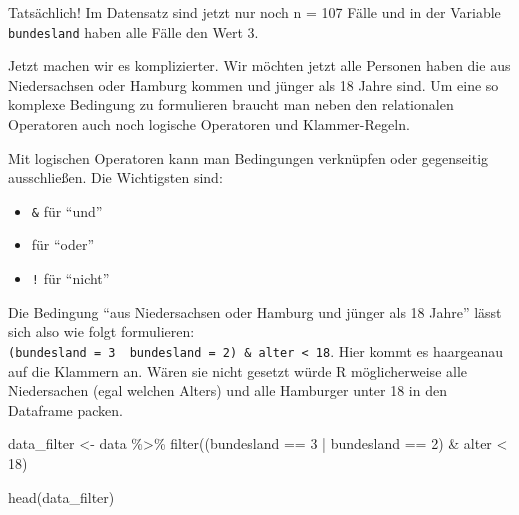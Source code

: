 \documentclass[
]{book}
\newenvironment{Shaded}{\begin{snugshade}}{\end{snugshade}}
\newcommand{\DecValTok}[1]{\textcolor[rgb]{0.00,0.00,0.81}{#1}}
\newcommand{\FunctionTok}[1]{\textcolor[rgb]{0.00,0.00,0.00}{#1}}
\newcommand{\NormalTok}[1]{#1}
\newcommand{\OtherTok}[1]{\textcolor[rgb]{0.56,0.35,0.01}{#1}}
\newcommand{\SpecialCharTok}[1]{\textcolor[rgb]{0.00,0.00,0.00}{#1}}
\begin{document}
Tatsächlich! Im Datensatz sind jetzt nur noch n = 107 Fälle und in der Variable \texttt{bundesland} haben alle Fälle den Wert 3.

Jetzt machen wir es komplizierter. Wir möchten jetzt alle Personen haben die aus Niedersachsen oder Hamburg kommen und jünger als 18 Jahre sind. Um eine so komplexe Bedingung zu formulieren braucht man neben den relationalen Operatoren auch noch logische Operatoren und Klammer-Regeln.

Mit logischen Operatoren kann man Bedingungen verknüpfen oder gegenseitig ausschließen. Die Wichtigsten sind:

\begin{itemize}
\item
  \texttt{\&} für ``und''
\item
  \texttt{\textbar{}} für ``oder''
\item
  \texttt{!} für ``nicht''
\end{itemize}

Die Bedingung ``aus Niedersachsen oder Hamburg und jünger als 18 Jahre'' lässt sich also wie folgt formulieren: \texttt{(bundesland\ =\ 3\ \textbar{}\ bundesland\ =\ 2)\ \&\ alter\ \textless{}\ 18}. Hier kommt es haargeanau auf die Klammern an. Wären sie nicht gesetzt würde R möglicherweise alle Niedersachen (egal welchen Alters) und alle Hamburger unter 18 in den Dataframe packen.

\begin{Shaded}
\begin{Highlighting}[]
\NormalTok{data\_filter }\OtherTok{\textless{}{-}}\NormalTok{ data }\SpecialCharTok{\%\textgreater{}\%} 
  \FunctionTok{filter}\NormalTok{((bundesland }\SpecialCharTok{==} \DecValTok{3} \SpecialCharTok{|}\NormalTok{ bundesland }\SpecialCharTok{==} \DecValTok{2}\NormalTok{) }\SpecialCharTok{\&}\NormalTok{ alter }\SpecialCharTok{\textless{}} \DecValTok{18}\NormalTok{)}

\FunctionTok{head}\NormalTok{(data\_filter)}
\end{Highlighting}
\end{Shaded}
\end{document}
